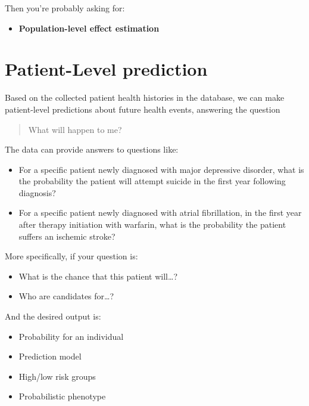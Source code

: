 \documentclass[11pt]{book}
\providecommand{\tightlist}{%
  \setlength{\itemsep}{0pt}\setlength{\parskip}{0pt}}
\theoremstyle{definition}
\theoremstyle{definition}
\theoremstyle{definition}
\theoremstyle{remark}
\begin{document}
Then you're probably asking for:

\begin{itemize}
\tightlist
\item
  \textbf{Population-level effect estimation}
\end{itemize}

\hypertarget{patient-level-prediction}{%
\section{Patient-Level prediction}\label{patient-level-prediction}}

Based on the collected patient health histories in the database, we can make patient-level predictions about future health events, answering the question

\begin{quote}
What will happen to me?
\end{quote}

The data can provide answers to questions like:

\begin{itemize}
\tightlist
\item
  For a specific patient newly diagnosed with major depressive disorder, what is the probability the patient will attempt suicide in the first year following diagnosis?
\item
  For a specific patient newly diagnosed with atrial fibrillation, in the first year after therapy initiation with warfarin, what is the probability the patient suffers an ischemic stroke?
\end{itemize}

More specifically, if your question is:

\begin{itemize}
\tightlist
\item
  What is the chance that this patient will\ldots?
\item
  Who are candidates for\ldots?
\end{itemize}

And the desired output is:

\begin{itemize}
\tightlist
\item
  Probability for an individual
\item
  Prediction model
\item
  High/low risk groups
\item
  Probabilistic phenotype
\end{itemize}
\end{document}
